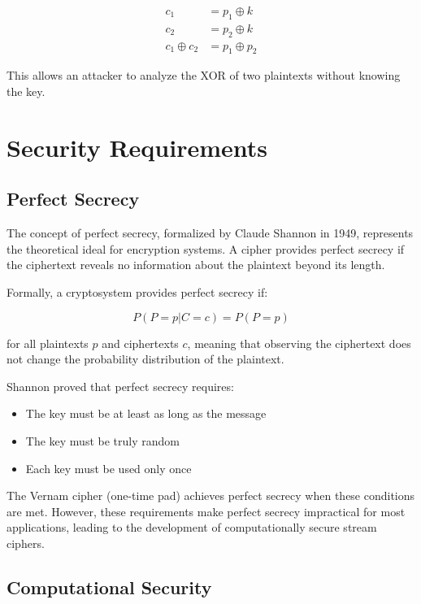 \documentclass[12pt,a4paper,oneside]{report}
\begin{document}
\begin{align}
    c_1 &= p_1 \oplus k \\
    c_2 &= p_2 \oplus k \\
    c_1 \oplus c_2 &= p_1 \oplus p_2
\end{align}

This allows an attacker to analyze the XOR of two plaintexts without knowing the key.

\section{Security Requirements}
\label{sec:security-requirements}

\subsection{Perfect Secrecy}

The concept of perfect secrecy, formalized by Claude Shannon in 1949, represents the theoretical ideal for encryption systems. A cipher provides perfect secrecy if the ciphertext reveals no information about the plaintext beyond its length.

Formally, a cryptosystem provides perfect secrecy if:

\begin{equation}
    P(P=p|C=c) = P(P=p)
\end{equation}

for all plaintexts $p$ and ciphertexts $c$, meaning that observing the ciphertext does not change the probability distribution of the plaintext.

Shannon proved that perfect secrecy requires:
\begin{itemize}
    \item The key must be at least as long as the message
    \item The key must be truly random
    \item Each key must be used only once
\end{itemize}

The Vernam cipher (one-time pad) achieves perfect secrecy when these conditions are met. However, these requirements make perfect secrecy impractical for most applications, leading to the development of computationally secure stream ciphers.

\subsection{Computational Security}
\end{document}
